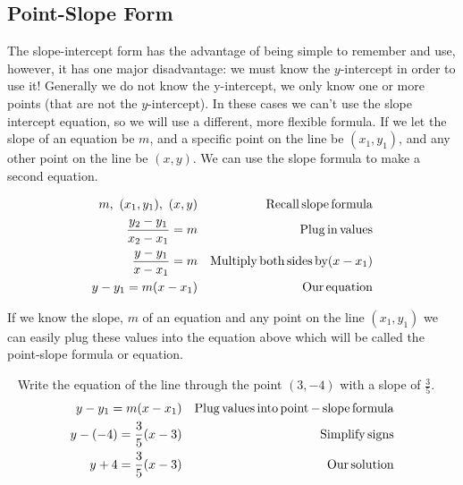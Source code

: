 \subsection{Point-Slope Form}\pp

 {}\pp

 The slope-intercept form has the advantage of being simple to remember and
use, however, it has one major disadvantage: we must know the $y$-intercept in
order to use it! Generally we do not know the y-intercept, we only know one or
more points (that are not the $y$-intercept). In these cases we can't use the
slope intercept equation, so we will use a different, more flexible formula. If
we let the slope of an equation be $m$, and a specific point on the line be
$(x_1, y_1)$, and any other point on the line be $(x, y)$. We can use the
slope formula to make a second equation.

\begin{example}\label{Lin62}
  
  \begin{eqnarray*}
    m,~ (x_1, y_1),~ (x, y) &  & \operatorname{Recall} \operatorname{slope} \operatorname{formula}\\
    \frac{y_2 - y_1}{x_2 - x_1} = m &  & \operatorname{Plug} \operatorname{in} \operatorname{values}\\
    \frac{y - y_1}{x - x_1} = m &  & \operatorname{Multiply} \operatorname{both} \operatorname{sides}
    \operatorname{by} (x - x_1)\\
    y - y_1 = m (x - x_1) &  & \operatorname{Our} \operatorname{equation}
  \end{eqnarray*}
\end{example}

 If we know the slope, $m$ of an equation and any point on the line $(x_1,
y_1)$ we can easily plug these values into the equation above which will be
called the point-slope formula or equation.\pp

\bbm
 {\tmstrong{\[ \tmop{Point} - \tmop{slope~} \tmop{equation} : y - y_1 = m (x -
   x_1) \]}}
\ebm
\pp

\begin{example}\label{Lin63}
 ~\pp
Write the equation of the line through the point $(3, - 4)$ with a slope of
  $\displaystyle\frac{3}{5}$.
  \begin{eqnarray*}
    y - y_1 = m (x - x_1) &  & \operatorname{Plug} \operatorname{values} \operatorname{into}
    \operatorname{point} - \operatorname{slope} \operatorname{formula}\\
    y - (- 4) = \frac{3}{5} (x - 3) &  & \operatorname{Simplify} \operatorname{signs}\\
    y + 4 = \frac{3}{5} (x - 3) &  & \operatorname{Our} \operatorname{solution}
  \end{eqnarray*}
\end{example}

